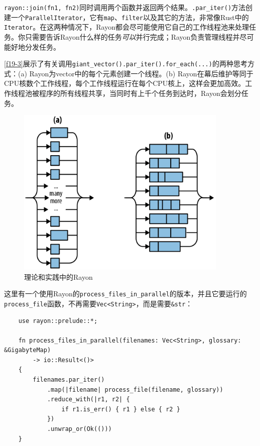 \texttt{rayon::join(fn1, fn2)}同时调用两个函数并返回两个结果。\texttt{.par\_iter()}方法创建一个\texttt{ParallelIterator}，它有\texttt{map}、\texttt{filter}以及其它的方法，非常像Rust中的\texttt{Iterator}。在这两种情况下，Rayon都会尽可能使用它自己的工作线程池来处理任务。你只需要告诉Rayon什么样的任务\emph{可以}并行完成；Rayon负责管理线程并尽可能好地分发任务。

\autoref{f19-3}展示了有关调用\texttt{giant\_vector().par\_iter().for\_each(...)}的两种思考方式：(a) Rayon为vector中的每个元素创建一个线程。(b) Rayon在幕后维护等同于CPU核数个工作线程，每个工作线程运行在每个CPU核上，这样会更加高效。工作线程池被程序的所有线程共享，当同时有上千个任务到达时，Rayon会划分任务。

\begin{figure}[htbp]
    \centering
    \includegraphics[width=0.9\textwidth]{../img/f19-3.png}
    \caption{理论和实践中的Rayon}
    \label{f19-3}
\end{figure}

这里有一个使用Rayon的\texttt{process\_files\_in\_parallel}的版本，并且它要运行的\texttt{process\_file}函数，不再需要\texttt{Vec<String>}，而是需要\texttt{\&str}：
\begin{verbatim}
    use rayon::prelude::*;

    fn process_files_in_parallel(filenames: Vec<String>, glossary: &GigabyteMap)
        -> io::Result<()>
    {
        filenames.par_iter()
            .map(|filename| process_file(filename, glossary))
            .reduce_with(|r1, r2| {
                if r1.is_err() { r1 } else { r2 }
            })
            .unwrap_or(Ok(()))
    }
\end{verbatim}

